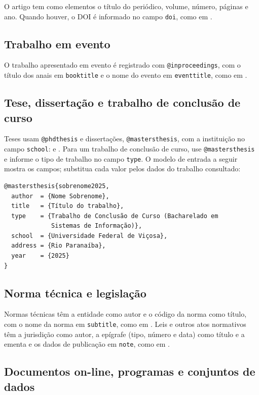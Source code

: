 \documentclass[
	12pt, %
	openright, %
	oneside, %
	a4paper, %
	sumario=tradicional, %
	english, %
	brazil, %
]{abntex2}
\begin{document}
O artigo tem como elementos o título do periódico, volume, número, páginas e ano. Quando houver, o DOI é informado no campo \texttt{doi}, como em .

\subsection{Trabalho em evento}

O trabalho apresentado em evento é registrado com \texttt{@inproceedings}, com o título dos anais em \texttt{booktitle} e o nome do evento em \texttt{eventtitle}, como em .

\subsection{Tese, dissertação e trabalho de conclusão de curso}\label{sec:tcc}

Teses usam \texttt{@phdthesis} e dissertações, \texttt{@mastersthesis}, com a instituição no campo \texttt{school}:  e . Para um trabalho de conclusão de curso, use \texttt{@mastersthesis} e informe o tipo de trabalho no campo \texttt{type}. O modelo de entrada a seguir mostra os campos; substitua cada valor pelos dados do trabalho consultado:

\begin{verbatim}
@mastersthesis{sobrenome2025,
  author  = {Nome Sobrenome},
  title   = {Título do trabalho},
  type    = {Trabalho de Conclusão de Curso (Bacharelado em
             Sistemas de Informação)},
  school  = {Universidade Federal de Viçosa},
  address = {Rio Paranaíba},
  year    = {2025}
}
\end{verbatim}

\subsection{Norma técnica e legislação}

Normas técnicas têm a entidade como autor e o código da norma como título, com o nome da norma em \texttt{subtitle}, como em . Leis e outros atos normativos têm a jurisdição como autor, a epígrafe (tipo, número e data) como título e a ementa e os dados de publicação em \texttt{note}, como em .

\subsection{Documentos on-line, programas e conjuntos de dados}
\end{document}
